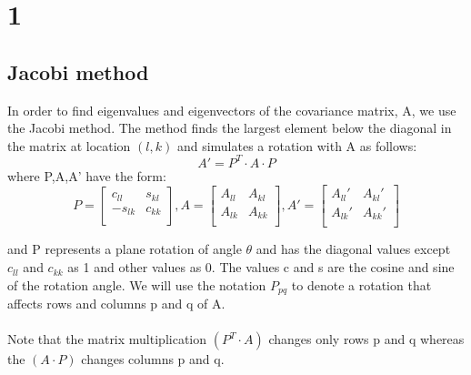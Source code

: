 \documentclass[12pt,twoside]{article}
\begin{document}
\section*{1}
\subsection*{Jacobi method}
In order to find eigenvalues and eigenvectors of the covariance matrix, A, we use the Jacobi method. The method finds the largest element below the diagonal in the matrix at location $(l,k)$ and simulates a rotation with A as follows:
\begin{equation}
     A' = P^T \cdot A \cdot P  
\end{equation}
where P,A,A' have the form:\\
\begin{equation}
P = 
\begin{bmatrix}
     c_{ll} & s_{kl} \\
    -s_{lk} & c_{kk} \\
\end{bmatrix}
,A = 
\begin{bmatrix}
     A_{ll} & A_{kl} \\
    A_{lk} & A_{kk} \\
\end{bmatrix}
,A' = 
\begin{bmatrix}
     A_{ll}' & A_{kl}' \\
    A_{lk}' & A_{kk}' \\
\end{bmatrix}
\end{equation}

and P represents a plane rotation of angle $\theta$ and has the diagonal values except $c_{ll}$ and $c_{kk}$ as 1 and other values as 0. The values c and s are the cosine and sine of the rotation angle. We will use the notation $P_{pq}$ to denote a rotation that affects rows and columns p and q of A. \\ \\
Note that the matrix multiplication $\left(P^T \cdot A \right)$ changes only rows p and q whereas the $\left(A \cdot P \right)$ changes columns p and q. \\
\end{document}

